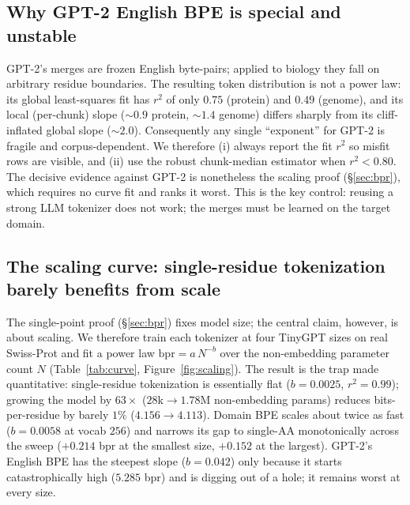 \documentclass[11pt]{article}
\begin{document}
\subsection{Why GPT-2 English BPE is special and unstable}
\label{sec:gpt2}
GPT-2's merges are frozen English byte-pairs; applied to biology they fall on
arbitrary residue boundaries. The resulting token distribution is not a power
law: its global least-squares fit has $r^2$ of only $0.75$ (protein) and $0.49$
(genome), and its local (per-chunk) slope (${\sim}0.9$ protein, ${\sim}1.4$
genome) differs sharply from its cliff-inflated global slope (${\sim}2.0$).
Consequently any single ``exponent'' for GPT-2 is fragile and corpus-dependent.
We therefore (i) always report the fit $r^2$ so misfit rows are visible, and
(ii) use the robust chunk-median estimator when $r^2 < 0.80$. The decisive
evidence against GPT-2 is nonetheless the scaling proof (\S\ref{sec:bpr}), which
requires no curve fit and ranks it worst. This is the key control: reusing a
strong LLM tokenizer does not work; the merges must be learned on the target
domain.

\subsection{The scaling curve: single-residue tokenization barely benefits from
scale}
\label{sec:scaling}
The single-point proof (\S\ref{sec:bpr}) fixes model size; the central claim,
however, is about scaling. We therefore train each tokenizer at four TinyGPT
sizes on real Swiss-Prot and fit a power law $\mathrm{bpr} = a\,N^{-b}$ over the
non-embedding parameter count $N$ (Table~\ref{tab:curve},
Figure~\ref{fig:scaling}). The result is the trap made quantitative:
single-residue tokenization is essentially flat ($b = 0.0025$, $r^2 = 0.99$);
growing the model by $63\times$ ($28$k$\to$$1.78$M non-embedding params) reduces
bits-per-residue by barely $1\%$ ($4.156 \to 4.113$). Domain BPE scales about
twice as fast ($b = 0.0058$ at vocab $256$) and narrows its gap to single-AA
monotonically across the sweep ($+0.214$ bpr at the smallest size, $+0.152$ at
the largest). GPT-2's English BPE has the steepest slope ($b = 0.042$) only
because it starts catastrophically high ($5.285$ bpr) and is digging out of a
hole; it remains worst at every size.
\end{document}
